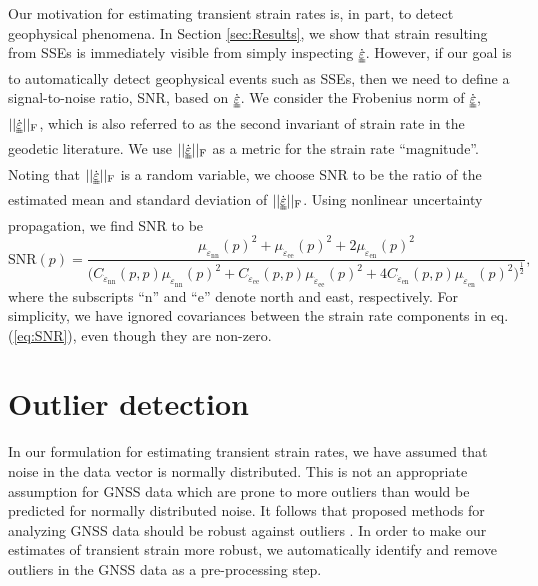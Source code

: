\documentclass[10pt,letter]{article}
\newcommand*{\du}[1]{\uuline{#1}}
\begin{document}
Our motivation for estimating transient strain rates is, in part, to detect geophysical phenomena. In Section \ref{sec:Results}, we show that strain resulting from SSEs is immediately visible from simply inspecting $\dot{\du{\varepsilon}}$. However, if our goal is to automatically detect geophysical events such as SSEs, then we need to define a signal-to-noise ratio, SNR, based on $\dot{\du{\varepsilon}}$. We consider the Frobenius norm of $\dot{\du{\varepsilon}}$, $||\dot{\du{\varepsilon}}||_\mathrm{F}$, which is also referred to as the second invariant of strain rate in the geodetic literature. We use $||\dot{\du{\varepsilon}}||_\mathrm{F}$ as a metric for the strain rate ``magnitude''. Noting that $||\dot{\du{\varepsilon}}||_\mathrm{F}$ is a random variable, we choose SNR to be the ratio of the estimated mean and standard deviation of $||\dot{\du{\varepsilon}}||_\mathrm{F}$. Using nonlinear uncertainty propagation, we find SNR to be  
\begin{equation}\label{eq:SNR}
\mathrm{SNR}(p) = \frac{\mu_{\dot{\varepsilon}_\mathrm{nn}}(p)^2 +
                        \mu_{\dot{\varepsilon}_\mathrm{ee}}(p)^2 +
                        2\mu_{\dot{\varepsilon}_\mathrm{en}}(p)^2}
                       {\big(C_{\dot{\varepsilon}_\mathrm{nn}}(p,p)\mu_{\dot{\varepsilon}_\mathrm{nn}}(p)^2 + 
                              C_{\dot{\varepsilon}_\mathrm{ee}}(p,p)\mu_{\dot{\varepsilon}_\mathrm{ee}}(p)^2 + 
                              4C_{\dot{\varepsilon}_\mathrm{en}}(p,p)\mu_{\dot{\varepsilon}_\mathrm{en}}(p)^2
                        \big)^{\frac{1}{2}}}
,
\end{equation}
where the subscripts ``n'' and ``e'' denote north and east, respectively. For simplicity, we have ignored covariances between the strain rate components in eq. (\ref{eq:SNR}), even though they are non-zero.  

\section{Outlier detection}\label{sec:Outlier}
In our formulation for estimating transient strain rates, we have assumed that noise in the data vector is normally distributed. This is not an appropriate assumption for GNSS data which are prone to more outliers than would be predicted for normally distributed noise. It follows that proposed methods for analyzing GNSS data should be robust against outliers \citep[e.g.,][]{Blewitt2016}. In order to make our estimates of transient strain more robust, we automatically identify and remove outliers in the GNSS data as a pre-processing step.
\end{document}
